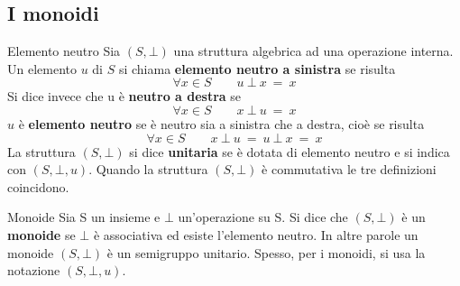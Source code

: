 \subsection{I monoidi}

\begin{defbox}{Elemento neutro}
	Sia $(S,\bot)$ una struttura algebrica ad una operazione interna. Un elemento $u$ di $S$ si chiama \textbf{elemento neutro a sinistra} se risulta
	\begin{equation}
		\forall x \in S\qquad u \ \bot \ x \ = \ x
	\end{equation}
	Si dice invece che u è \textbf{neutro a destra} se
	\begin{equation}
		\forall x \in S\qquad x \ \bot \ u \ = \ x
	\end{equation}
	$u$ è \textbf{elemento neutro} se è neutro sia a sinistra che a destra, cioè se risulta
	\begin{equation}
		\forall x \in S \qquad x\ \bot \ u \ = \ u \ \bot \ x \ = \ x
	\end{equation}
	La struttura $(S, \bot)$ si dice \textbf{unitaria} se è dotata di elemento neutro e si indica con $(S, \bot, u)$. Quando la struttura $(S, \bot)$ è commutativa le tre definizioni coincidono.
\end{defbox}

\begin{defbox}{Monoide}
	Sia S un insieme e $\bot$ un'operazione su S. Si dice che $(S, \bot)$ è un \textbf{monoide} se $\bot$ è associativa ed esiste l'elemento neutro. In altre parole un monoide $(S, \bot)$ è un semigruppo unitario. Spesso, per i monoidi, si usa la notazione $(S, \bot, u)$.
\end{defbox}


